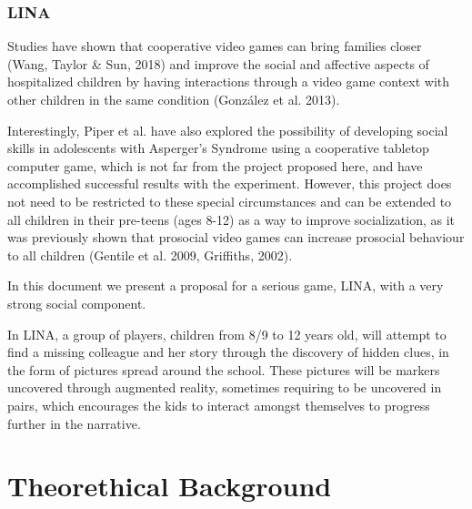 \documentclass[runningheads]{llncs}
\begin{document}
\subsubsection{LINA}
\par Studies have shown that cooperative video games can bring families closer (Wang, Taylor \& Sun, 2018) and improve the social and affective aspects of hospitalized children by having interactions through a video game context with other children in the same condition (González et al. 2013).  
\par Interestingly, Piper et al. have also explored the possibility of developing social skills in adolescents with Asperger's Syndrome using a cooperative tabletop computer game, which is not far from the project proposed here, and have accomplished successful results with the experiment. 
However, this project does not need to be restricted to these special circumstances and can be extended to all children in their pre-teens (ages 8-12) as a way to improve socialization, as it was previously shown that prosocial video games can increase prosocial behaviour to all children (Gentile et al. 2009, Griffiths, 2002).
\par In this document we present a proposal for a serious game, LINA, with a very strong social component. 
\par In LINA, a group of players, children from 8/9 to 12 years old, will attempt to find a missing colleague and her story through the discovery of hidden clues, in the form of pictures spread around the school. These pictures will be markers uncovered through augmented reality, sometimes requiring to be uncovered in pairs, which encourages the kids to interact amongst themselves to progress further in the narrative.

\section{Theorethical Background}
\end{document}
